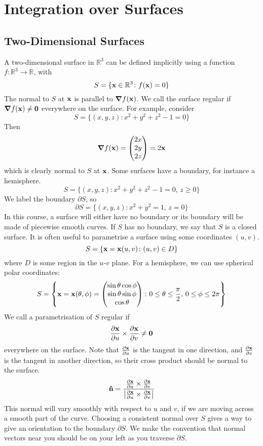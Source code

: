 \documentclass{article}
\begin{document}
\section{Integration over Surfaces}
\subsection{Two-Dimensional Surfaces}
A two-dimensional surface in $\mathbb R^3$ can be defined implicitly using a function $f \colon \mathbb R^3 \to \mathbb R$, with
\[ S = \{ \vb x \in \mathbb R^3 \colon f(\vb x) = 0 \} \]
The normal to $S$ at $\vb x$ is parallel to $\grad f(\vb x)$. We call the surface regular if $\grad f(\vb x) \neq \vb 0$ everywhere on the surface. For example, consider
\[ S = \{ (x, y, z) \colon x^2 + y^2 + z^2 - 1 = 0 \} \]
Then
\[ \grad f(\vb x) = \begin{pmatrix}
		2x \\ 2y \\ 2z
	\end{pmatrix} = 2\vb x \]
which is clearly normal to $S$ at $\vb x$. Some surfaces have a boundary, for instance a hemisphere.
\[ S = \{ (x, y, z) \colon x^2 + y^2 + z^2 - 1 = 0,\,z \geq 0 \} \]
We label the boundary $\partial S$, so
\[ \partial S = \{ (x, y, z) \colon x^2 + y^2 = 1,\,z = 0 \} \]
In this course, a surface will either have no boundary or its boundary will be made of piecewise smooth curves. If $S$ has no boundary, we say that $S$ is a closed surface. It is often useful to parametrise a surface using some coordinates $(u, v)$.
\[ S = \{ \vb x = \vb x(u, v) \colon (u, v) \in D \} \]
where $D$ is some region in the $u$-$v$ plane. For a hemisphere, we can use spherical polar coordinates:
\[ S = \left\{ \vb x = \vb x(\theta, \phi) = \begin{pmatrix}
		\sin\theta \cos\phi \\ \sin\theta \sin\phi \\ \cos\theta
	\end{pmatrix} \colon 0 \leq \theta \leq \frac{\pi}{2},\, 0 \leq \phi \leq 2\pi \right\} \]
We call a parametrisation of $S$ regular if
\[ \frac{\partial \vb x}{\partial u} \times \frac{\partial \vb x}{\partial v} \neq \vb 0 \]
everywhere on the surface. Note that $\frac{\partial \vb x}{\partial u}$ is the tangent in one direction, and $\frac{\partial \vb x}{\partial v}$ is the tangent in another direction, so their cross product should be normal to the surface.
\[ \vu n = \frac{\frac{\partial \vb x}{\partial u} \times \frac{\partial \vb x}{\partial v}}{\abs{\frac{\partial \vb x}{\partial u} \times \frac{\partial \vb x}{\partial v}}} \]
This normal will vary smoothly with respect to $u$ and $v$, if we are moving across a smooth part of the curve. Choosing a consistent normal over $S$ gives a way to give an orientation to the boundary $\partial S$. We make the convention that normal vectors near you should be on your left as you traverse $\partial S$.
\end{document}
